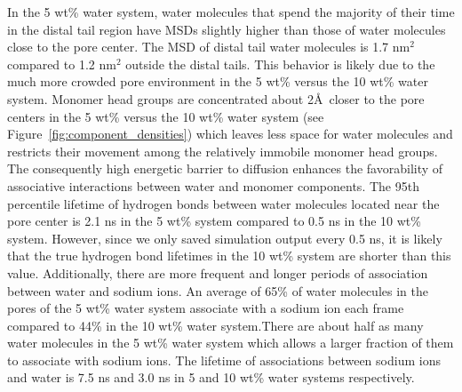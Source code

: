 \documentclass[journal=jpcbfk,manuscript=article]{achemso}
\begin{document}
  In the 5 wt\% water system, water molecules that spend the majority of their 
  time in the distal tail region have MSDs slightly higher than those of water molecules
  close to the pore center. The MSD of distal tail water molecules is 1.7 nm$^2$
  compared to 1.2 nm$^2$ outside the distal tails. This behavior is likely due to the
  much more crowded pore environment in the 5 wt\% versus the 10 wt\% water system. 
  Monomer head groups are concentrated about 2\AA~closer to the pore centers in the
  5 wt\% versus the 10 wt\% water system (see Figure~\ref{fig:component_densities})  %
  which leaves less space for water molecules and restricts their movement among the 
  relatively immobile monomer head groups. The consequently high energetic barrier 
  to diffusion enhances the favorability of associative interactions between water
  and monomer components. The 95th percentile lifetime of hydrogen bonds between 
  water molecules located near the pore center is 2.1 ns in the 5 wt\% system compared
  to 0.5 ns in the 10 wt\% system. However, since we only saved simulation output 
  every 0.5 ns, it is likely that the true hydrogen bond lifetimes in the 10 wt\% 
  system are shorter than this value. Additionally, there are more frequent and longer
  periods of association between water and sodium ions. An average of 65\% of water 
  molecules in the pores of the 5 wt\% water system associate with a sodium ion each
  frame compared to 44\% in the 10 wt\% water system.There are about half as many water
  molecules in the 5 wt\% water system which allows a larger fraction of them to 
  associate with sodium ions. The lifetime of associations between sodium ions and 
  water is 7.5 ns and 3.0 ns in 5 and 10 wt\% water systems respectively.
  
\end{document}
